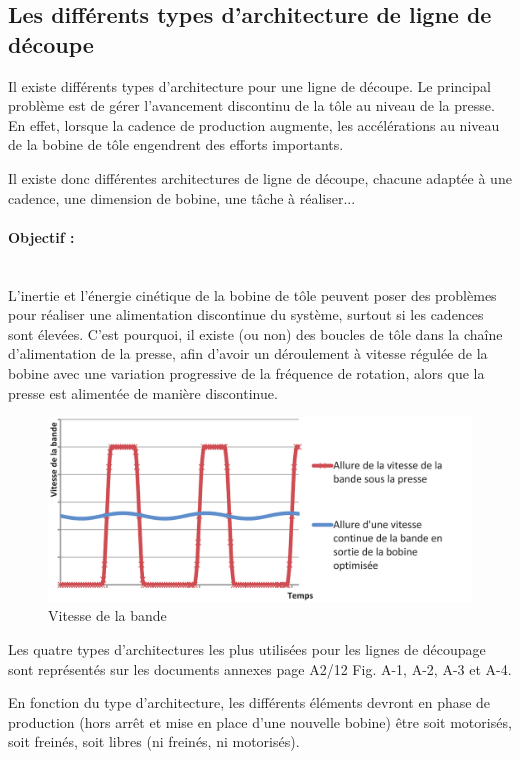 \subsection{Les différents types d'architecture de ligne de découpe}

Il existe différents types d'architecture pour une ligne de découpe. Le principal problème est de
gérer l'avancement discontinu de la tôle au niveau de la presse. En effet, lorsque la cadence de
production augmente, les accélérations au niveau de la bobine de tôle engendrent des efforts
importants.

Il existe donc différentes architectures de ligne de découpe, chacune adaptée à une cadence,
une dimension de bobine, une tâche à réaliser...

\paragraph{Objectif :} ~\ \\
L'inertie et l'énergie cinétique de la bobine de tôle peuvent poser des problèmes pour réaliser
une alimentation discontinue du système, surtout si les cadences sont élevées. C'est pourquoi,
il existe (ou non) des \og boucles \fg de tôle dans la chaîne d'alimentation de la presse, afin d'avoir
un déroulement à vitesse régulée de la bobine avec une variation progressive de la fréquence
de rotation, alors que la presse est alimentée de manière discontinue.

\begin{figure}[!h]
 \centering\includegraphics[width=0.7\linewidth]{img/fig7b}
 \caption{Vitesse de la bande}
 \label{fig7b}
\end{figure}

Les quatre types d'architectures les plus utilisées pour les lignes de découpage sont
représentés sur les documents annexes page A2/12 Fig. A-1, A-2, A-3 et A-4.

En fonction du type d'architecture, les différents éléments devront en phase de production (hors
arrêt et mise en place d'une nouvelle bobine) être soit motorisés, soit freinés, soit libres (ni
freinés, ni motorisés).

